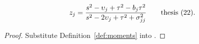 \begin{theorem}\label{thm:bestZ_linear}
  \leanok
  \[
    z_j = \frac{s^2 - \upsilon_j + \tau^2 - b_j\tau^2}{s^2 - 2\upsilon_j + \tau^2 + \sigma_{jj}^2}
    \qquad\text{thesis~(22).}
  \]
\end{theorem}
\begin{proof}
  \leanok
  Substitute Definition~\ref{def:moments} into .
\end{proof}

